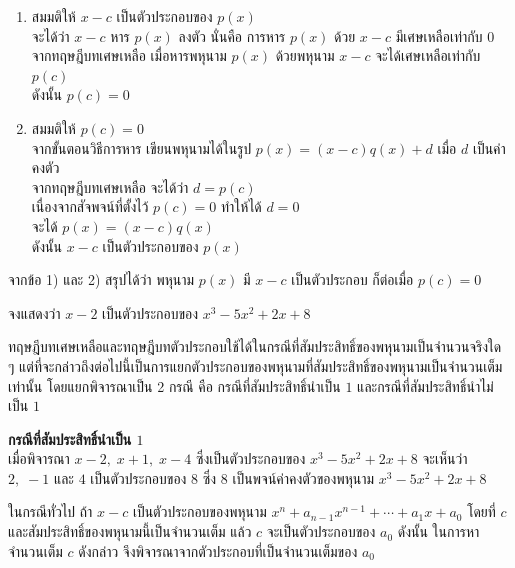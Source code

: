 \proof
\begin{enumerate}[label=\arabic*), leftmargin=2em, itemsep=0.8em]
	\item สมมติให้ $x-c$ เป็นตัวประกอบของ $p(x)$ \\
	จะได้ว่า $x-c$ หาร $p(x)$ ลงตัว นั่นคือ การหาร $p(x)$ ด้วย $x-c$ มีเศษเหลือเท่ากับ $0$ \\
	จากทฤษฎีบทเศษเหลือ เมื่อหารพหุนาม $p(x)$ ด้วยพหุนาม $x-c$ จะได้เศษเหลือเท่ากับ $p(c)$ \\
	ดังนั้น $p(c) = 0$
	
	\item สมมติให้ $p(c) = 0$ \\
	จากขั้นตอนวิธีการหาร เขียนพหุนามได้ในรูป $p(x) = (x-c)q(x) + d$ เมื่อ $d$ เป็นค่าคงตัว \\
	จากทฤษฎีบทเศษเหลือ จะได้ว่า $d = p(c)$ \\
	เนื่องจากสัจพจน์ที่ตั้งไว้ $p(c) = 0$ ทำให้ได้ $d = 0$ \\
	จะได้ $p(x) = (x-c)q(x)$ \\
	ดังนั้น $x-c$ เป็นตัวประกอบของ $p(x)$
\end{enumerate}
จากข้อ 1) และ 2) สรุปได้ว่า พหุนาม $p(x)$ มี $x-c$ เป็นตัวประกอบ ก็ต่อเมื่อ $p(c) = 0$

\vspace{1em}

\begin{examplebox}
	จงแสดงว่า $x-2$ เป็นตัวประกอบของ $x^3 - 5x^2 + 2x + 8$
\end{examplebox}
\solution
\newpage

ทฤษฎีบทเศษเหลือและทฤษฎีบทตัวประกอบใช้ได้ในกรณีที่สัมประสิทธิ์ของพหุนามเป็นจำนวนจริงใด ๆ แต่ที่จะกล่าวถึงต่อไปนี้เป็นการแยกตัวประกอบของพหุนามที่สัมประสิทธิ์ของพหุนามเป็นจำนวนเต็มเท่านั้น โดยแยกพิจารณาเป็น 2 กรณี คือ กรณีที่สัมประสิทธิ์นำเป็น $1$ และกรณีที่สัมประสิทธิ์นำไม่เป็น $1$

\vspace{1em}
\noindent\textbf{กรณีที่สัมประสิทธิ์นำเป็น $1$} \\[0.5em]
เมื่อพิจารณา $x-2, \; x+1, \; x-4$ ซึ่งเป็นตัวประกอบของ $x^3 - 5x^2 + 2x + 8$ จะเห็นว่า $2, \; -1$ และ $4$ เป็นตัวประกอบของ $8$ ซึ่ง $8$ เป็นพจน์ค่าคงตัวของพหุนาม $x^3 - 5x^2 + 2x + 8$

ในกรณีทั่วไป ถ้า $x-c$ เป็นตัวประกอบของพหุนาม $x^n + a_{n-1}x^{n-1} + \cdots + a_1x + a_0$ โดยที่ $c$ และสัมประสิทธิ์ของพหุนามนี้เป็นจำนวนเต็ม แล้ว $c$ จะเป็นตัวประกอบของ $a_0$ ดังนั้น ในการหาจำนวนเต็ม $c$ ดังกล่าว จึงพิจารณาจากตัวประกอบที่เป็นจำนวนเต็มของ $a_0$


